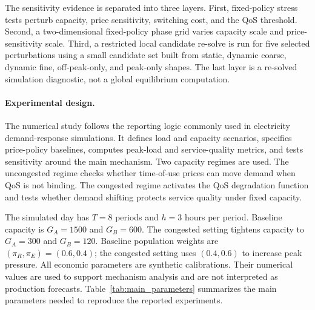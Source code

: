 \documentclass[11pt,a4paper]{article}
\begin{document}
The sensitivity evidence is separated into three layers. First, fixed-policy stress tests perturb capacity, price sensitivity, switching cost, and the QoS threshold. Second, a two-dimensional fixed-policy phase grid varies capacity scale and price-sensitivity scale. Third, a restricted local candidate re-solve is run for five selected perturbations using a small candidate set built from static, dynamic coarse, dynamic fine, off-peak-only, and peak-only shapes. The last layer is a re-solved simulation diagnostic, not a global equilibrium computation.

\paragraph{Experimental design.}
\label{sec:setup}

The numerical study follows the reporting logic commonly used in electricity demand-response simulations. It defines load and capacity scenarios, specifies price-policy baselines, computes peak-load and service-quality metrics, and tests sensitivity around the main mechanism. Two capacity regimes are used. The uncongested regime checks whether time-of-use prices can move demand when QoS is not binding. The congested regime activates the QoS degradation function and tests whether demand shifting protects service quality under fixed capacity.

The simulated day has $T=8$ periods and $h=3$ hours per period. Baseline capacity is $G_A=1500$ and $G_B=600$. The congested setting tightens capacity to $G_A=300$ and $G_B=120$. Baseline population weights are $(\pi_R,\pi_E)=(0.6,0.4)$; the congested setting uses $(0.4,0.6)$ to increase peak pressure. All economic parameters are synthetic calibrations. Their numerical values are used to support mechanism analysis and are not interpreted as production forecasts. Table~\ref{tab:main_parameters} summarizes the main parameters needed to reproduce the reported experiments.
\end{document}
